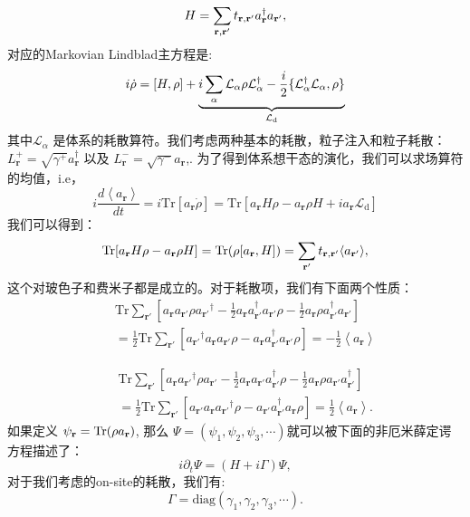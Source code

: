 \documentclass[supercite]{HustGraduPaper}
\def\r{\mathbf{r}}
\begin{document}
   \begin{equation}
   H = \sum_{{\bf r},{\bf r'}} t_{{\bf r},{\bf r'}} a_{\bf r}^\dagger a_{\bf r'},
   \end{equation}
   对应的Markovian Lindblad主方程是:
   \begin{equation}
   i\dot{\rho} = [H,\rho] + \underbrace{i \sum_\alpha \mathcal{L}_\alpha \rho \mathcal{L}_\alpha^\dagger - {i \over 2} \{\mathcal{L}_\alpha^\dagger \mathcal{L}_\alpha, \rho\}}_{\mathcal{L}_{\text{d}}} 
   \end{equation}
   其中$\mathcal{L}_\alpha$ 是体系的耗散算符。我们考虑两种基本的耗散，粒子注入和粒子耗散： $L^+_{\r} = \sqrt{\gamma^+} a_{\r}^\dagger$ 以及 $L^-_{\r} = 
   \sqrt{\gamma^-} a_{\r}$,.
   为了得到体系想干态的演化，我们可以求场算符的均值，i.e，
   \begin{equation}
   \label{eq: Supp8}
   i\frac{d\left\langle a_{\r}\right\rangle }{dt}  = i \text{Tr}[a_\r \dot{\rho}] = \text{Tr} [ a_{\r}H\rho - a_{\r}\rho H + i a_{\r} \mathcal{L}_{\text{d}}]
   \end{equation}
   我们可以得到：
   \begin{equation}
   \text{Tr} [a_{\r}H\rho - a_{\r}\rho H] = \text{Tr} (\rho [a_{\r}, H]) = \sum_{\bf r'} t_{{\bf r},{\bf r'}} \langle a_{\bf r'} \rangle,
   \end{equation}
   这个对玻色子和费米子都是成立的。对于耗散项，我们有下面两个性质：
    \begin{equation}
   \begin{aligned}
   && \text{Tr}\sum\limits_{\r'} {\left[ {{a_\r}{a_{\r'}}\rho {a_{\r'}}^\dag  - \frac{1}{2}{a_\r}a_{\r'}^\dag {a_{\r'}}\rho  - \frac{1}{2}{a_\r}\rho a_{\r'}^\dag {a_{\r'}}} \right]}\\ 
   &&= \frac{1}{2}\text{Tr}\sum\limits_{\r'} {\left[ {{a_{\r'}}^\dag {a_\r}{a_{\r'}}\rho  - {a_\r}a_{\r'}^\dag {a_{\r'}}\rho } \right]}  =  - \frac{1}{2} \left\langle a_\r \right\rangle
   \end{aligned}
   \end{equation}
   
   \begin{equation}
   \begin{aligned}
   && \text{Tr}\sum\limits_{\r'} {\left[ {{a_\r}{a_{\r'}}^\dag \rho {a_{\r'}} - \frac{1}{2}{a_\r}{a_{\r'}}a_{\r'}^\dag \rho  - \frac{1}{2}{a_\r}\rho {a_{\r'}}a_{\r'}^\dag } \right]}\\
   & &= \frac{1}{2}\text{Tr}\sum\limits_{\r'} {\left[ {{a_{\r'}}{a_\r}{a_{\r'}}^\dag \rho  - {a_{\r'}}a_{\r'}^\dag {a_\r}\rho } \right]}  = \frac{1}{2} \left\langle a_\r \right\rangle.
   \end{aligned}
   \end{equation}
  如果定义 $\psi_{\bf r} = \text{Tr}(\rho a_{\bf r})$, 那么 $\Psi = (\psi_1, \psi_2, \psi_3, \cdots)$就可以被下面的非厄米薛定谔方程描述了：
   \begin{equation}
   i\partial_t \Psi = (H + i\Gamma) \Psi,
   \end{equation}
   对于我们考虑的on-site的耗散，我们有:
   \begin{equation}
   \Gamma = \text{diag}(\gamma_1, \gamma_2, \gamma_3, \cdots).
   \end{equation}
   
\end{document}
